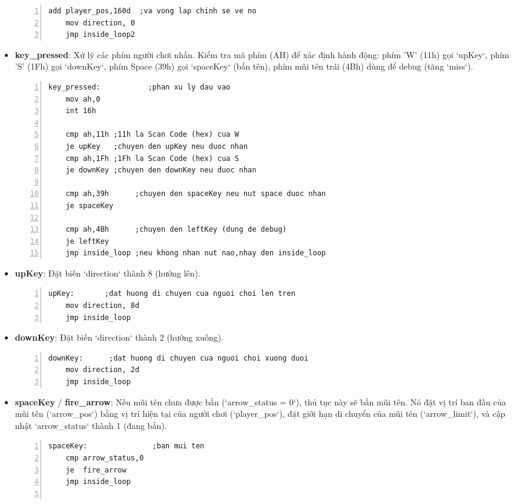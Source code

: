 \documentclass[12pt,a4paper,openany,oneside]{report}
\begin{document}
\begin{itemize}
\begin{lstlisting}[caption={Mã nguồn nhãn player_down}, basicstyle=\ttfamily\footnotesize, numbers=left, numberstyle=\tiny, stepnumber=1, numbersep=5pt, breaklines=true, language={[x86masm]Assembler}]
    add player_pos,160d  ;va vong lap chinh se ve no
    mov direction, 0
    jmp inside_loop2
\end{lstlisting} 
    \item \textbf{key\_pressed}: Xử lý các phím người chơi nhấn. Kiểm tra mã phím (AH) để xác định hành động: phím 'W' (11h) gọi `upKey`, phím 'S' (1Fh) gọi `downKey`, phím Space (39h) gọi `spaceKey` (bắn tên), phím mũi tên trái (4Bh) dùng để debug (tăng `miss`).
\begin{lstlisting}[caption={Mã nguồn nhãn key_pressed}, basicstyle=\ttfamily\footnotesize, numbers=left, numberstyle=\tiny, stepnumber=1, numbersep=5pt, breaklines=true, language={[x86masm]Assembler}]
key_pressed:           ;phan xu ly dau vao
    mov ah,0
    int 16h

    cmp ah,11h ;11h la Scan Code (hex) cua W     
    je upKey   ;chuyen den upKey neu duoc nhan
    cmp ah,1Fh ;1Fh la Scan Code (hex) cua S    
    je downKey ;chuyen den downKey neu duoc nhan
    
    cmp ah,39h      ;chuyen den spaceKey neu nut space duoc nhan
    je spaceKey
    
    cmp ah,4Bh      ;chuyen den leftKey (dung de debug)
    je leftKey
    jmp inside_loop ;neu khong nhan nut nao,nhay den inside_loop
\end{lstlisting}    
    \item \textbf{upKey}: Đặt biến `direction` thành 8 (hướng lên).
\begin{lstlisting}[caption={Mã nguồn nhãn upKey}, basicstyle=\ttfamily\footnotesize, numbers=left, numberstyle=\tiny, stepnumber=1, numbersep=5pt, breaklines=true, language={[x86masm]Assembler}]
upKey:       ;dat huong di chuyen cua nguoi choi len tren
    mov direction, 8d
    jmp inside_loop
\end{lstlisting}    
    \item \textbf{downKey}: Đặt biến `direction` thành 2 (hướng xuống).
\begin{lstlisting}[caption={Mã nguồn nhãn downKey}, basicstyle=\ttfamily\footnotesize, numbers=left, numberstyle=\tiny, stepnumber=1, numbersep=5pt, breaklines=true, language={[x86masm]Assembler}]
downKey:      ;dat huong di chuyen cua nguoi choi xuong duoi
    mov direction, 2d   
    jmp inside_loop
\end{lstlisting} 
    \item \textbf{spaceKey} / \textbf{fire\_arrow}: Nếu mũi tên chưa được bắn (`arrow_status = 0`), thủ tục này sẽ bắn mũi tên. Nó đặt vị trí ban đầu của mũi tên (`arrow_pos`) bằng vị trí hiện tại của người chơi (`player_pos`), đặt giới hạn di chuyển của mũi tên (`arrow_limit`), và cập nhật `arrow_status` thành 1 (đang bắn).
\begin{lstlisting}[caption={Mã nguồn nhãn spaceKey/fire_arrow}, basicstyle=\ttfamily\footnotesize, numbers=left, numberstyle=\tiny, stepnumber=1, numbersep=5pt, breaklines=true, language={[x86masm]Assembler}]
spaceKey:               ;ban mui ten
    cmp arrow_status,0
    je  fire_arrow
    jmp inside_loop


\end{lstlisting}
\end{itemize}
\end{document}

